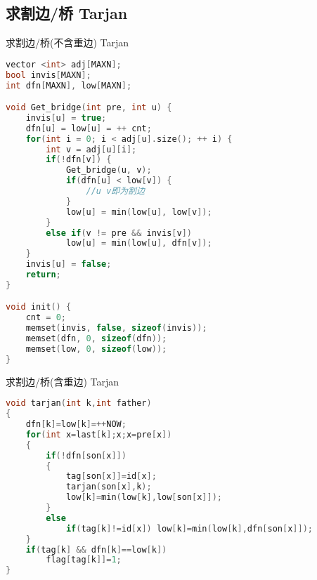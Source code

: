 \subsection{求割边/桥 Tarjan}
求割边/桥(不含重边) Tarjan
    \begin{lstlisting}[language=c++]
    vector <int> adj[MAXN];
bool invis[MAXN];
int dfn[MAXN], low[MAXN];

void Get_bridge(int pre, int u) {
    invis[u] = true;
    dfn[u] = low[u] = ++ cnt;
    for(int i = 0; i < adj[u].size(); ++ i) {
        int v = adj[u][i];
        if(!dfn[v]) {
            Get_bridge(u, v);
            if(dfn[u] < low[v]) {
                //u v即为割边
            }
            low[u] = min(low[u], low[v]);
        }
        else if(v != pre && invis[v])
            low[u] = min(low[u], dfn[v]);
    }
    invis[u] = false;
    return;
}

void init() {
    cnt = 0;
    memset(invis, false, sizeof(invis));
    memset(dfn, 0, sizeof(dfn));
    memset(low, 0, sizeof(low));
}
    \end{lstlisting}
求割边/桥(含重边) Tarjan
    \begin{lstlisting}[language=c++]
void tarjan(int k,int father)
{
	dfn[k]=low[k]=++NOW;
    for(int x=last[k];x;x=pre[x])
    {
        if(!dfn[son[x]])
        {
			tag[son[x]]=id[x];
            tarjan(son[x],k);
            low[k]=min(low[k],low[son[x]]);    
        }            
        else
            if(tag[k]!=id[x]) low[k]=min(low[k],dfn[son[x]]);
    }
    if(tag[k] && dfn[k]==low[k])
		flag[tag[k]]=1;
}
    \end{lstlisting}
